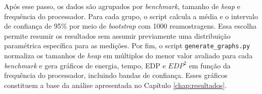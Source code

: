 Após esse passo, os dados são agrupados por \textit{benchmark}, tamanho de
\textit{heap} e frequência do processador. Para cada grupo, o script calcula a
média e o intervalo de confiança de 95\% por meio de \textit{bootstrap} com
1000 reamostragens. Essa escolha permite resumir os resultados sem assumir
previamente uma distribuição paramétrica específica para as medições. Por fim,
o script \texttt{generate\_graphs.py} normaliza os tamanhos de \textit{heap}
em múltiplos do menor valor avaliado para cada \textit{benchmark} e gera
gráficos de energia, tempo, EDP e \(EDP^2\) em função da frequência do
processador, incluindo bandas de confiança. Esses gráficos constituem a base da
análise apresentada no Capítulo \ref{chap:resultados}.
